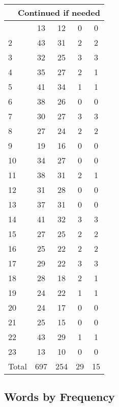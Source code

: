 \begin{center}
\begin{longtable}{l|c|c|c|c}
\hline \multicolumn{5}{|r|}{{Continued if needed}} \\ \hline
\endfoot 
1 & 13 & 12 & 0 & 0\\ \hline
2 & 43 & 31 & 2 & 2\\ \hline
3 & 32 & 25 & 3 & 3\\ \hline
4 & 35 & 27 & 2 & 1\\ \hline
5 & 41 & 34 & 1 & 1\\ \hline
6 & 38 & 26 & 0 & 0\\ \hline
7 & 30 & 27 & 3 & 3\\ \hline
8 & 27 & 24 & 2 & 2\\ \hline
9 & 19 & 16 & 0 & 0\\ \hline
10 & 34 & 27 & 0 & 0\\ \hline
11 & 38 & 31 & 2 & 1\\ \hline
12 & 31 & 28 & 0 & 0\\ \hline
13 & 37 & 31 & 0 & 0\\ \hline
14 & 41 & 32 & 3 & 3\\ \hline
15 & 27 & 25 & 2 & 2\\ \hline
16 & 25 & 22 & 2 & 2\\ \hline
17 & 29 & 22 & 3 & 3\\ \hline
18 & 28 & 18 & 2 & 1\\ \hline
19 & 24 & 22 & 1 & 1\\ \hline
20 & 24 & 17 & 0 & 0\\ \hline
21 & 25 & 15 & 0 & 0\\ \hline
22 & 43 & 29 & 1 & 1\\ \hline
23 & 13 & 10 & 0 & 0\\ \hline
\hline \hline
Total & 697 & 254 & 29 & 15



\end{longtable}
\end{center}

 
\subsection{Words by Frequency}

